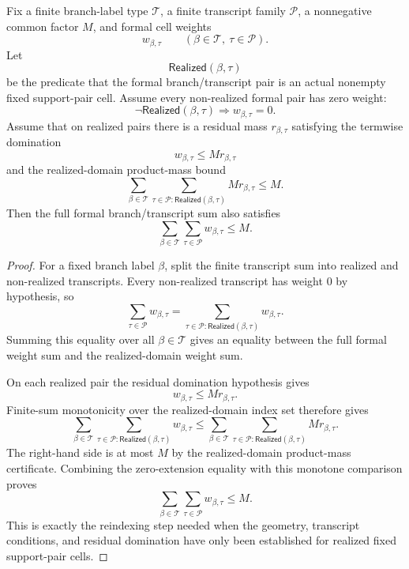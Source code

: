 \begin{helper}
Fix a finite branch-label type \(\mathcal T\), a finite transcript family
\(\mathcal P\), a nonnegative common factor \(M\), and formal cell weights
\[
w_{\beta,\tau}
\qquad(\beta\in\mathcal T,\ \tau\in\mathcal P).
\]
Let
\[
\mathsf{Realized}(\beta,\tau)
\]
be the predicate that the formal branch/transcript pair is an actual
nonempty fixed support-pair cell.  Assume every non-realized formal pair has
zero weight:
\[
\neg\mathsf{Realized}(\beta,\tau)\Longrightarrow w_{\beta,\tau}=0.
\]
Assume that on realized pairs there is a residual mass
\(r_{\beta,\tau}\) satisfying the termwise domination
\[
w_{\beta,\tau}\le M r_{\beta,\tau}
\]
and the realized-domain product-mass bound
\[
\sum_{\beta\in\mathcal T}
  \sum_{\tau\in\mathcal P:\mathsf{Realized}(\beta,\tau)}
    M r_{\beta,\tau}
\le M .
\]
Then the full formal branch/transcript sum also satisfies
\[
\sum_{\beta\in\mathcal T}\sum_{\tau\in\mathcal P}
  w_{\beta,\tau}\le M .
\]
\end{helper}
\begin{proof}
For a fixed branch label \(\beta\), split the finite transcript sum into
realized and non-realized transcripts.  Every non-realized transcript has
weight \(0\) by hypothesis, so
\[
\sum_{\tau\in\mathcal P}w_{\beta,\tau}
=
\sum_{\tau\in\mathcal P:\mathsf{Realized}(\beta,\tau)}
  w_{\beta,\tau}.
\]
Summing this equality over all \(\beta\in\mathcal T\) gives an equality
between the full formal weight sum and the realized-domain weight sum.

On each realized pair the residual domination hypothesis gives
\[
w_{\beta,\tau}\le M r_{\beta,\tau}.
\]
Finite-sum monotonicity over the realized-domain index set therefore gives
\[
\sum_{\beta\in\mathcal T}
  \sum_{\tau\in\mathcal P:\mathsf{Realized}(\beta,\tau)}
    w_{\beta,\tau}
\le
\sum_{\beta\in\mathcal T}
  \sum_{\tau\in\mathcal P:\mathsf{Realized}(\beta,\tau)}
    M r_{\beta,\tau}.
\]
The right-hand side is at most \(M\) by the realized-domain product-mass
certificate.  Combining the zero-extension equality with this monotone
comparison proves
\[
\sum_{\beta\in\mathcal T}\sum_{\tau\in\mathcal P}w_{\beta,\tau}\le M.
\]
This is exactly the reindexing step needed when the geometry, transcript
conditions, and residual domination have only been established for realized
fixed support-pair cells.
\end{proof}
